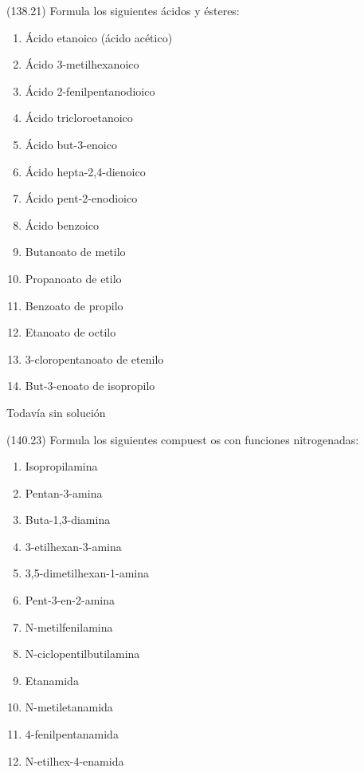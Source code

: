   \begin{exercise}[
      tags    = {},
      topics  = {química, química orgánica, orgánica},
      source  = {FQ 1B MGH 2016, p138, e21},
    ]
    (138.21) Formula los siguientes ácidos y ésteres:
    \begin{enumerate}
      \item Ácido etanoico (ácido acético)
      \item Ácido 3-metilhexanoico
      \item Ácido 2-fenilpentanodioico
      \item Ácido tricloroetanoico
      \item Ácido but-3-enoico
      \item Ácido hepta-2,4-dienoico
      \item Ácido pent-2-enodioico
      \item Ácido benzoico
      \item Butanoato de metilo
      \item Propanoato de etilo
      \item Benzoato de propilo
      \item Etanoato de octilo
      \item 3-cloropentanoato de etenilo
      \item But-3-enoato de isopropilo
    \end{enumerate}
  \end{exercise}

  \begin{solution}[print=false]
    Todavía sin solución
  \end{solution}




  \begin{exercise}[
      tags    = {},
      topics  = {química, química orgánica, orgánica},
      source  = {FQ 1B MGH 2016, p140, e23},
    ]
    (140.23) Formula los siguientes compuest os con funciones nitrogenadas:
    \begin{enumerate}
      \item Isopropilamina
      \item Pentan-3-amina
      \item Buta-1,3-diamina
      \item 3-etilhexan-3-amina
      \item 3,5-dimetilhexan-1-amina
      \item Pent-3-en-2-amina
      \item N-metilfenilamina
      \item N-ciclopentilbutilamina
      \item Etanamida
      \item N-metiletanamida
      \item 4-fenilpentanamida
      \item N-etilhex-4-enamida
    \end{enumerate}
  \end{exercise}

